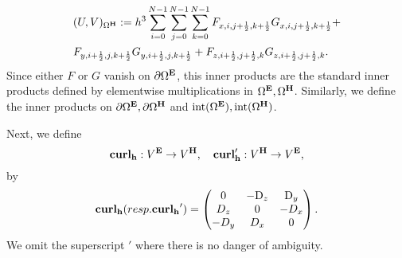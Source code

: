 \documentclass[12pt,reqno]{amsart}
\newcommand{\D}{{\rm D}}
\newcommand{\curl}{{\bf curl}}
\newcommand{\e}{{\bf E}}
\newcommand{\h}{{\bf H}}
\theoremstyle{definition}
\numberwithin{equation}{section}
\newcommand{\intr}[1]{\mathrm{int}(#1)}
\def\Gw{\Omega}     \def\Gx{\Xi}         \def\Gy{\Psi}
\begin{document}
		\begin{align*}
			&
			(U,V)_{\Gw^\h}:=
			h^3\sum_{i=0}^{N-1}\sum_{j=0}^{N-1}\sum_{k=0}^{N-1}
			F_{x,i,j+\frac{1}{2},k+\frac{1}{2}}G_{x,i,j+\frac{1}{2},k+\frac{1}{2}}+\\&
			F_{y,i+\frac{1}{2},j,k+\frac{1}{2}}G_{y,i+\frac{1}{2},j,k+\frac{1}{2}}+F_{z,i+\frac{1}{2},j+\frac{1}{2},k}G_{z,i+\frac{1}{2},j+\frac{1}{2},k}.
		\end{align*}
		Since either $F$ or $G$ vanish on $\partial \Gw^\e$, this inner products are the standard inner products defined by elementwise  multiplications in $\Gw^\e, \Gw^\h$.
		Similarly, we define the inner products on $\partial \Gw^\e, \partial \Gw^\h$
		and $\intr{\Gw^\e},\intr{\Gw^\h}$.
		
		
		
		Next, we define 
		$$
		\mathbf{\curl_h}:V^{\bf{E}}\to V^{\bf{H}}, \quad 
		\mathbf{\curl_h'}:V^{\bf{H}}\to V^{\bf{E}},
		$$
		by
		$$
		\mathbf{\curl_h}( resp. \mathbf{\curl_h}')=
		\begin{pmatrix}
			0& -\D_z & \D _y\\
			D_z&0&-D_x\\
			-D_y&D_x&0\\
		\end{pmatrix}.
		$$
		We omit the superscript $'$ where there is no danger of ambiguity.
		
\end{document}
